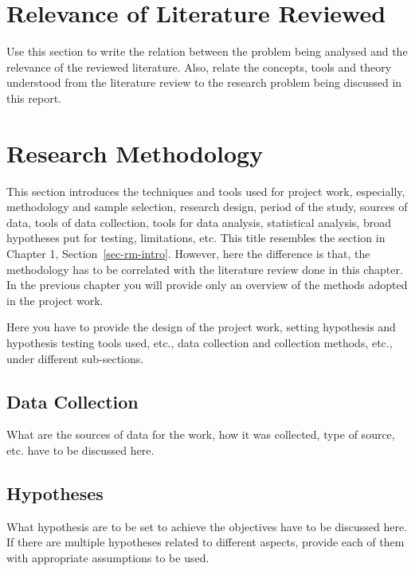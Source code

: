 \section{Relevance of Literature Reviewed}

Use this section to write the relation between the problem being analysed and the relevance of the reviewed literature. Also, relate the concepts, tools and theory understood from the literature review to the research problem being discussed in this report.

\section{Research Methodology}\label{sec-rm}

This section introduces the techniques and tools used for project work, especially, methodology and sample selection, research design, period of the study, sources of data, tools of data collection, tools for data analysis, statistical analysis, broad hypotheses put for testing, limitations, etc. This title resembles the section in Chapter 1, Section~\ref{sec-rm-intro}. However, here the difference is that, the methodology has to be correlated with the literature review done in this chapter. In the previous chapter you will provide only an overview of the methods adopted in the project work.


Here you have to provide the design of the project work, setting hypothesis and hypothesis testing tools used, etc., data collection and collection methods, etc., under different sub-sections.

\subsection{Data Collection}

What are the sources of data for the work, how it was collected, type of source, etc. have to be discussed here. 

\subsection{Hypotheses}
What hypothesis are to be set to achieve the objectives have to be discussed here. If there are multiple hypotheses related to different aspects, provide each of them with appropriate assumptions to be used. 

